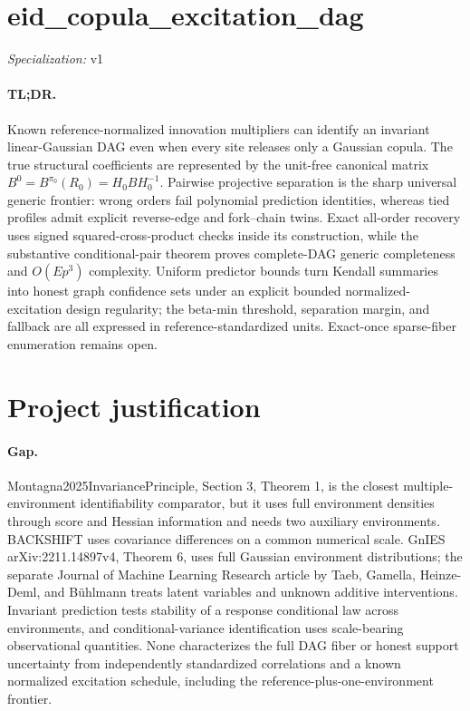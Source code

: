 \documentclass{article}
\begin{document}
\sloppy

\section*{eid\_\allowbreak{}copula\_\allowbreak{}excitation\_\allowbreak{}dag}

\noindent\textit{Specialization:} v1\par

\paragraph{TL;DR.} Known reference-normalized innovation multipliers can identify an invariant linear-Gaussian DAG even when every site releases only a Gaussian copula. The true structural coefficients are represented by the unit-free canonical matrix \(B^0=B^{\pi_0}(R_0)=H_0BH_0^{-1}\). Pairwise projective separation is the sharp universal generic frontier: wrong orders fail polynomial prediction identities, whereas tied profiles admit explicit reverse-edge and fork--chain twins. Exact all-order recovery uses signed squared-cross-product checks inside its construction, while the substantive conditional-pair theorem proves complete-DAG generic completeness and \(O(Ep^3)\) complexity. Uniform predictor bounds turn Kendall summaries into honest graph confidence sets under an explicit bounded normalized-excitation design regularity; the beta-min threshold, separation margin, and fallback are all expressed in reference-standardized units. Exact-once sparse-fiber enumeration remains open.

\section{Project justification}

\paragraph{Gap.} Montagna2025InvariancePrinciple, Section 3, Theorem 1, is the closest multiple-environment identifiability comparator, but it uses full environment densities through score and Hessian information and needs two auxiliary environments. BACKSHIFT uses covariance differences on a common numerical scale. GnIES arXiv:2211.14897v4, Theorem 6, uses full Gaussian environment distributions; the separate Journal of Machine Learning Research article by Taeb, Gamella, Heinze-Deml, and Bühlmann treats latent variables and unknown additive interventions. Invariant prediction tests stability of a response conditional law across environments, and conditional-variance identification uses scale-bearing observational quantities. None characterizes the full DAG fiber or honest support uncertainty from independently standardized correlations and a known normalized excitation schedule, including the reference-plus-one-environment frontier.
\end{document}
